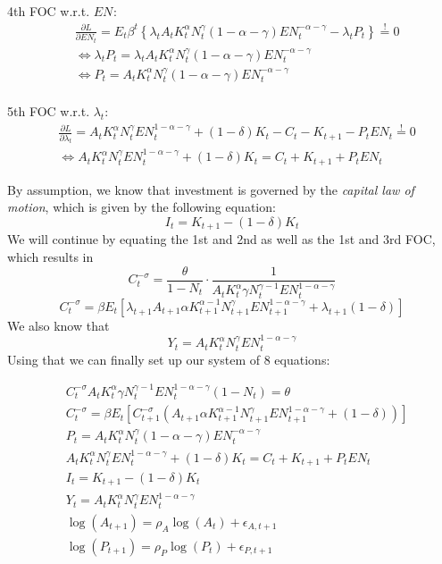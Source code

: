 \documentclass[a4paper,11pt]{article}
\begin{document}
4th FOC w.r.t. $EN_{}$:
\begin{align*}
    & \frac{\partial L}{\partial EN_t} = E_t\beta^t\left\{ \lambda_tA_tK_t^\alpha N_t^\gamma (1-\alpha-\gamma)EN_t^{-\alpha-\gamma} - \lambda_tP_t\right\}\overset{!}{=}0\\
    &\iff \lambda_tP_t = \lambda_tA_tK_t^\alpha N_t^\gamma (1-\alpha-\gamma)EN_t^{-\alpha-\gamma}\\
    &\iff P_t = A_tK_t^\alpha N_t^\gamma (1-\alpha-\gamma)EN_t^{-\alpha-\gamma}\\
\end{align*}

5th FOC w.r.t. $\lambda_t$:
\begin{align*}
    &\frac{\partial L}{\partial \lambda_t} = A_tK_t^\alpha N_t^\gamma EN_t^{1-\alpha-\gamma} + (1-\delta)K_t - C_t - K_{t+1}-P_tEN_t \overset{!}{=}0\\
    &\iff A_tK_t^\alpha N_t^\gamma EN_t^{1-\alpha-\gamma} + (1-\delta)K_t = C_t + K_{t+1}+P_tEN_t
\end{align*}

By assumption, we know that investment is governed by the \textit{capital law of motion}, which is given by the following equation:
\begin{equation*}
    I_t = K_{t+1} - (1-\delta)K_t
\end{equation*}
We will continue by equating the 1st and 2nd as well as the 1st and 3rd FOC, which results in
$$C_t^{-\sigma}=\frac{\theta}{1-N_t}\cdot \frac{1}{A_tK_t^\alpha \gamma N_t^{\gamma-1} EN_t^{1-\alpha-\gamma}}$$
$$C_t^{-\sigma}=\beta E_t \left[ \lambda_{t+1}A_{t+1}\alpha K_{t+1}^{\alpha-1} N_{t+1}^\gamma EN_{t+1}^{1-\alpha-\gamma}+\lambda_{t+1}(1-\delta)\right]$$
We also know that 
$$Y_t = A_tK_t^\alpha N_t^\gamma EN_t^{1-\alpha-\gamma}$$
Using that we can finally set up our system of 8 equations:

\begin{align}
    & C_t^{-\sigma}A_tK_t^\alpha \gamma N_t^{\gamma-1} EN_t^{1-\alpha-\gamma}(1-N_t)=\theta\\
    &C_t^{-\sigma}=\beta E_t \left[ C_{t+1}^{-\sigma}\left(A_{t+1}\alpha K_{t+1}^{\alpha-1} N_{t+1}^\gamma EN_{t+1}^{1-\alpha-\gamma}+(1-\delta)\right)\right]\\
    &P_t = A_tK_t^\alpha N_t^\gamma (1-\alpha-\gamma)EN_t^{-\alpha-\gamma}\\
    & A_tK_t^\alpha N_t^\gamma EN_t^{1-\alpha-\gamma} + (1-\delta)K_t = C_t + K_{t+1}+P_tEN_t\\
    &I_t = K_{t+1} - (1-\delta)K_t\\
    &Y_t = A_tK_t^\alpha N_t^\gamma EN_t^{1-\alpha-\gamma}\\
    &\log(A_{t+1}) = \rho_A \log(A_{t}) + \epsilon_{A,t+1}\\
    &\log(P_{t+1}) = \rho_P \log(P_{t}) + \epsilon_{P,t+1}
\end{align}
\end{document}
